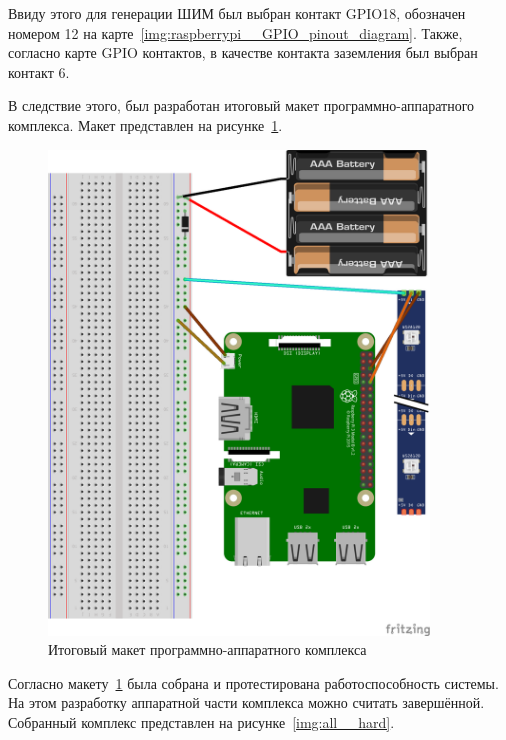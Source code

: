 Ввиду этого для генерации ШИМ был выбран контакт GPIO18, обозначен номером 12 на карте~\ref{img:raspberrypi__GPIO_pinout_diagram}. Также, согласно карте GPIO контактов, в качестве контакта заземления был выбран контакт 6.

В следствие этого, был разработан итоговый макет программно-аппаратного комплекса. Макет представлен на рисунке~\ref{img:all__schema}.

\begin{figure}[H]
  \centering
  \includegraphics[angle=-90, width=0.9\textwidth]{assets/images/practical/Итоговая архитектура программно-аппаратного комплекса.png}
  \caption{Итоговый макет программно-аппаратного комплекса}
  \label{img:all__schema}
\end{figure}

Согласно макету~\ref{img:all__schema} была собрана и протестирована работоспособность системы. На этом разработку аппаратной части комплекса можно считать завершённой. Собранный комплекс представлен на рисунке~\ref{img:all__hard}.

